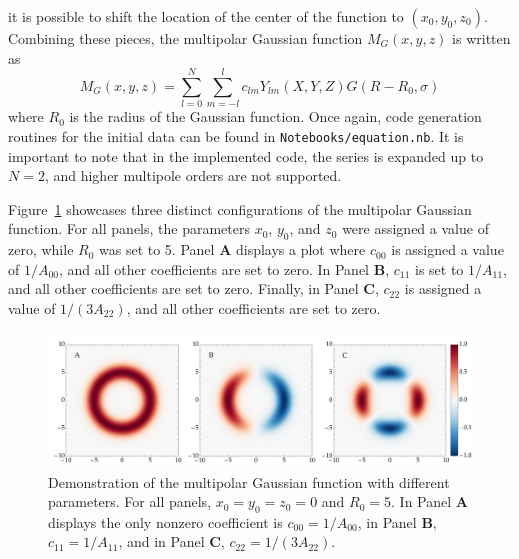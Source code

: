 %
it is possible to shift the location of the center of the function to $(x_0,y_0,z_0)$. Combining these pieces, the multipolar Gaussian function $M_G(x,y,z)$ is written as
%
\begin{equation}
  M_G(x, y, z) = \sum_{l=0}^{N}\sum_{m = -l}^{l} c_{l m} Y_{l m}(X,Y,Z) G(R-R_0,\sigma)
  \label{eq:wave_scattering_multipolar_gaussian}
\end{equation}
%
where $R_0$ is the radius of the Gaussian function. Once again, code generation routines for the initial data can be found in \texttt{Notebooks/equation.nb}. It is important to note that in the implemented code, the series is expanded up to $N = 2$, and higher multipole orders are not supported.

Figure~\ref{fig:multipolar_gaussian_id_demo} showcases three distinct configurations of the multipolar Gaussian function. For all panels, the parameters $x_0$, $y_0$, and $z_0$ were assigned a value of zero, while $R_0$ was set to 5. Panel \textbf{A} displays a plot where $c_{00}$ is assigned a value of $1/A_{00}$, and all other coefficients are set to zero. In Panel \textbf{B}, $c_{11}$ is set to $1/A_{11}$, and all other coefficients are set to zero. Finally, in Panel \textbf{C}, $c_{22}$ is assigned a value of $1/(3A_{22})$, and all other coefficients are set to zero.

\begin{figure}[!ht]
  \centering
  \includegraphics[width=\linewidth]{img/wave_scattering/multipolar_gaussian_id_examples.png}
  \caption{Demonstration of the multipolar Gaussian function with different parameters. For all panels, $x_0 = y_0 = z_0 = 0$ and $R_0 = 5$. In Panel \textbf{A} displays the only nonzero coefficient is $c_{00} = 1/A_{00}$, in Panel \textbf{B}, $c_{11} = 1/A_{11}$, and in Panel \textbf{C}, $c_{22} = 1/(3A_{22})$.}
  \label{fig:multipolar_gaussian_id_demo}
\end{figure}